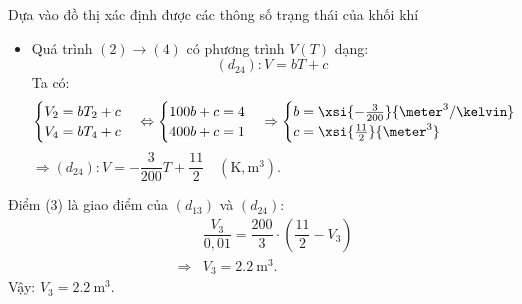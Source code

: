 \begin{dang}{Dựa vào đồ thị xác định được các thông số trạng thái của khối khí}
{{\begin{itemize}
			\item Quá trình $(2)\rightarrow (4)$ có phương trình $V\left(T\right)$ dạng:
			$$\left(d_{24}\right): V=bT+c$$
			Ta có:
			\begin{equation*}
				\begin{cases}
					V_2=bT_2+c\\
					V_4=bT_4+c
				\end{cases}
				\Leftrightarrow
				\begin{cases}
					100b+c=4\\
					400b+c=1
				\end{cases}
				\Rightarrow 
				\begin{cases}
					b=\xsi{-\frac{3}{200}}{\meter^3/\kelvin}\\
					c=\xsi{\frac{11}{2}}{\meter^3}
				\end{cases}
			\end{equation*}
			$\Rightarrow \left(d_{24}\right): V=-\dfrac{3}{200}T+\dfrac{11}{2}\quad \left(\si{\kelvin}, \si{\meter^3}\right).$
			
		\end{itemize}
		Điểm (3) là giao điểm của $\left(d_{13}\right)$ và $\left(d_{24}\right)$:
		\begin{eqnarray*}
			&& \dfrac{V_3}{0,01}=\dfrac{200}{3}\cdot\left(\dfrac{11}{2}-V_3\right)\\
			&\Rightarrow& V_3=\SI{2.2}{\meter^3}.
		\end{eqnarray*}
		Vậy: $V_3=\SI{2.2}{\meter^3}$.
		
	}}
	
\end{dang}